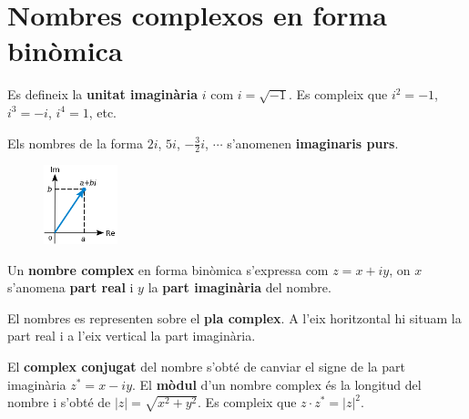 \newpage
\section{Nombres complexos en forma binòmica}

	\begin{theorybox}
			
		Es defineix la \textbf{unitat imaginària} $i$ com $i=\sqrt{-1}$. Es compleix que $i^2=-1$, $i^3=-i$, $i^4=1$, etc. \vspace{0.2cm}
		
		Els nombres de la forma $2i$, $5i$, $-\frac{3}{2}i$, $\cdots$ s'anomenen \textbf{imaginaris purs}.
 		
	 	 \begin{figure}
	    	\vspace{-1cm} 
	    	\centering
	    	\includegraphics[width=0.19\textwidth]{img-04/pla-complex}
		 \end{figure}
 
			Un \textbf{nombre complex} en forma binòmica s'expressa com \linebreak $z=x+iy$, on $x$ s'anomena
			\textbf{part real} i $y$ la \textbf{part imaginària} del nombre.\vspace{0.2cm}
		 
				El nombres es representen sobre el \textbf{pla complex}. A l'eix horitzontal hi situam la part
			real i a l'eix vertical la part imaginària.  \vspace{0.2cm}
			
			El \textbf{complex conjugat} del nombre s'obté de canviar el signe de la part imaginària $z^* = x-iy$. El \textbf{mòdul} d'un nombre complex és la longitud 
			del nombre i s'obté de $|z|=\sqrt{x^2+y^2}$. Es compleix que $z\cdot z^*=|z|^2$.

			\vspace{0.5cm}
	\end{theorybox}

